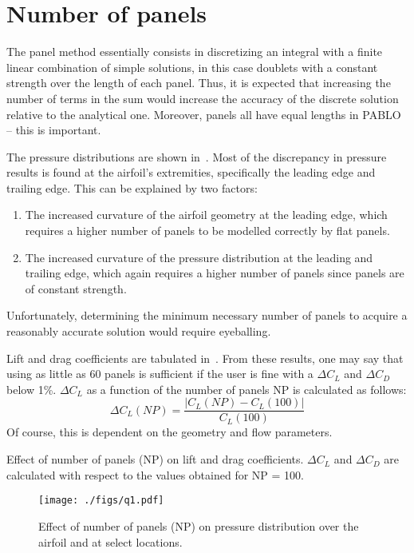 \section{Number of panels}

The panel method essentially consists in discretizing an integral with a finite linear combination of
simple solutions, in this case doublets with a constant strength over the length of each panel.
Thus, it is expected that increasing the number of terms in the sum would increase the
accuracy of the discrete solution relative to the analytical one. Moreover, panels all have
equal lengths in PABLO -- this is important.

The pressure distributions are shown in~. Most of the discrepancy in pressure
results is found at the airfoil's extremities, specifically the leading edge and trailing edge.
This can be explained by two factors:
\begin{enumerate}
    \item The increased curvature of the airfoil geometry at the leading edge, which requires a higher
        number of panels to be modelled correctly by flat panels.
    \item The increased curvature of the pressure distribution at the leading and trailing edge, which
        again requires a higher number of panels since panels are of constant strength.
\end{enumerate}
Unfortunately, determining the minimum necessary number of panels to acquire a reasonably accurate
solution would require eyeballing.

Lift and drag coefficients are tabulated in~. From these results, one may say that using as
little as 60 panels is sufficient if the user is fine with a $\Delta C_L$ and $\Delta C_D$ below 1\%. $\Delta C_L$ as
a function of the number of panels NP is calculated as follows:
\begin{equation*}
    \Delta C_L(NP) = \frac{|C_L(NP) - C_L(100)|}{C_L(100)}
\end{equation*}
Of course, this is dependent on the geometry and flow parameters.
\begin{table}
    \centering
    \caption{Effect of number of panels (NP) on lift and drag coefficients. $\Delta C_L$ and $\Delta C_D$
        are calculated with respect to the values obtained for NP = 100.}
    \label{tab:q1}
    
\end{table}

\begin{figure}[H]
    \centering
    \texttt{[image: ./figs/q1.pdf]}
    \caption{Effect of number of panels (NP) on pressure distribution over the airfoil and at
        select locations.}\label{fig:q1}
\end{figure}

